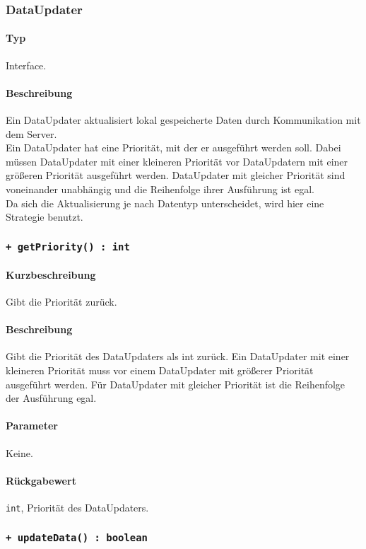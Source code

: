 \subsubsection{DataUpdater}
\paragraph*{Typ}
Interface.
\paragraph*{Beschreibung}
Ein DataUpdater aktualisiert lokal gespeicherte Daten durch Kommunikation mit dem Server.\\
Ein DataUpdater hat eine Priorität, mit der er ausgeführt werden soll. Dabei müssen 
DataUpdater mit einer kleineren Priorität vor DataUpdatern mit einer größeren Priorität 
ausgeführt werden. DataUpdater mit gleicher Priorität sind voneinander unabhängig und
die Reihenfolge ihrer Ausführung ist egal.\\
Da sich die Aktualisierung je nach Datentyp unterscheidet, wird hier eine Strategie benutzt.

\subsubsection*{\texttt{+ getPriority() : int}}%
\paragraph*{Kurzbeschreibung}
Gibt die Priorität zurück.
\paragraph*{Beschreibung}
Gibt die Priorität des DataUpdaters als int zurück. Ein DataUpdater mit einer kleineren
Priorität muss vor einem DataUpdater mit größerer Priorität ausgeführt werden.
Für DataUpdater mit gleicher Priorität ist die Reihenfolge der Ausführung egal.
\paragraph*{Parameter}
Keine.
\paragraph*{Rückgabewert}
\texttt{int}, Priorität des DataUpdaters.

\subsubsection*{\texttt{+ updateData() : boolean}}%
